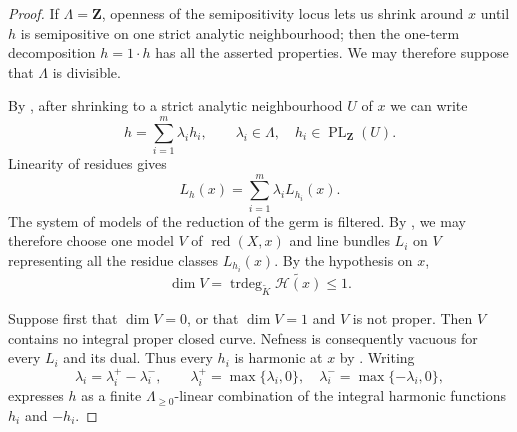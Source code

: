 \begin{proof}
If $\Lambda=\mathbf Z$, openness of the semipositivity locus
\cite[Remark~7.3(4)]{GJR26} lets us shrink around $x$ until $h$ is
semipositive on one strict analytic neighbourhood; then the one-term
decomposition $h=1\cdot h$ has all the asserted properties.  We may
therefore suppose that $\Lambda$ is divisible.

By \cite[Proposition~5.8]{GJR26}, after shrinking to a strict analytic
neighbourhood $U$ of $x$ we can write
\[
                         h=\sum_{i=1}^m\lambda_i h_i,
 \qquad \lambda_i\in\Lambda,\quad h_i\in\operatorname{PL}_{\mathbf Z}(U).
\]
Linearity of residues \cite[Lemma~6.18]{GJR26} gives
\[
                         L_h(x)=\sum_{i=1}^m\lambda_iL_{h_i}(x).
\]
The system of models of the reduction of the germ is filtered.  By
\cite[Lemma~6.5 and \S6.6]{GJR26}, we may therefore choose one model $V$ of
$\operatorname{red}(X,x)$ and line bundles $L_i$ on $V$ representing all
the residue classes $L_{h_i}(x)$.  By the hypothesis on $x$,
\[
        \dim V=\operatorname{trdeg}_{\widetilde K}
                    \widetilde{\mathscr H(x)}\leq1.
\]

Suppose first that $\dim V=0$, or that $\dim V=1$ and $V$ is not proper.
Then $V$ contains no integral proper closed curve.  Nefness is consequently
vacuous for every $L_i$ and its dual.  Thus every $h_i$ is harmonic at $x$
by \cite[Proposition~7.1]{GJR26}.  Writing
\[
          \lambda_i=\lambda_i^+-\lambda_i^-,\qquad
          \lambda_i^+=\max\{\lambda_i,0\},\quad
          \lambda_i^-=\max\{-\lambda_i,0\},
\]
expresses $h$ as a finite $\Lambda_{\geq0}$-linear combination of the
integral harmonic functions $h_i$ and $-h_i$.


\end{proof}

